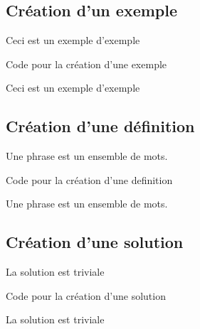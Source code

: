 \subsection{Création d'un exemple}

\begin{exemple}
    Ceci est un exemple d'exemple
\end{exemple}

\begin{Latex}{Code pour la création d'une exemple}
\begin{exemple}
    Ceci est un exemple d'exemple
\end{exemple}
\end{Latex}

\subsection{Création d'une définition}

\begin{definition}
    Une phrase est un ensemble de mots.
\end{definition}

\begin{Latex}{Code pour la création d'une definition}
\begin{definition}
    Une phrase est un ensemble de mots.
\end{definition}
\end{Latex}


\subsection{Création d'une solution}

\begin{solution}
   La solution est triviale
\end{solution}

\begin{Latex}{Code pour la création d'une solution}
\begin{solution}
    La solution est triviale
\end{solution}
\end{Latex}



